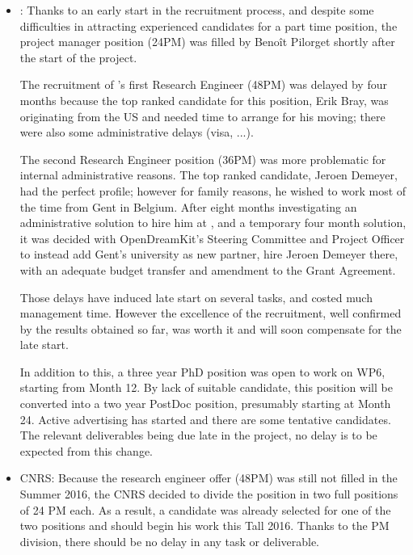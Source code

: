 \documentclass{deliverablereport}
\begin{document}
\begin{itemize}
\item{:}
  Thanks to an early start in the recruitment process, and despite
  some difficulties in attracting experienced candidates for a part
  time position, the project manager position (24PM) was filled by
  Benoît Pilorget shortly after the start of the project.

  The recruitment of 's first Research Engineer (48PM) was
  delayed by four months because the top ranked candidate for this
  position, Erik Bray, was originating from the US and needed time to
  arrange for his moving; there were also some administrative delays
  (visa, ...).

  The second Research Engineer position (36PM) was more problematic
  for internal administrative reasons. The top ranked candidate,
  Jeroen Demeyer, had the perfect profile; however for family reasons,
  he wished to work most of the time from Gent in Belgium. After eight
  months investigating an administrative solution to hire him at
  , and a temporary four month solution, it was decided with
  OpenDreamKit's Steering Committee and Project Officer to instead add
  Gent's university as new partner, hire Jeroen Demeyer there, with an
  adequate budget transfer and amendment to the Grant Agreement.

  Those delays have induced late start on several tasks, and costed
  much management time. However the excellence of the recruitment, well
  confirmed by the results obtained so far, was worth it and will soon
  compensate for the late start.

  In addition to this, a three year PhD position was open to work on
  WP6, starting from Month 12. By lack of suitable candidate, this
  position will be converted into a two year PostDoc position,
  presumably starting at Month 24. Active advertising has started and
  there are some tentative candidates. The relevant deliverables being
  due late in
  the project, no delay is to be expected from this change.\\

\item{CNRS:} Because the research engineer offer (48PM) was still not
  filled in the Summer 2016, the CNRS decided to divide the position
  in two full positions of 24 PM each. As a result, a candidate was
  already selected for one of the two positions and should begin his
  work this Tall 2016.  Thanks to the PM division, there should be no
  delay in any task or
  deliverable. \\


\end{itemize}
\end{document}
